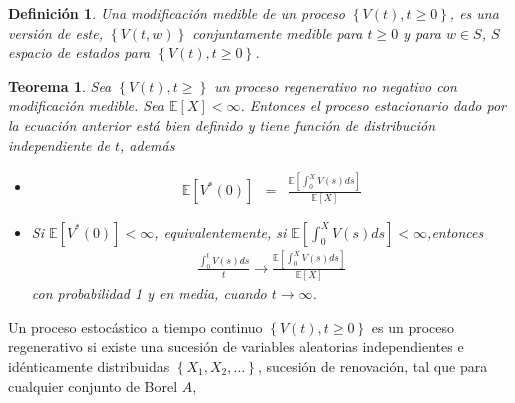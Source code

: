 \documentclass{article}
\newtheorem{Def}{Definición}
\newtheorem{Teo}{Teorema}
\newcommand{\esp}{\mathbb{E}}
\begin{document}
\begin{Def}
Una modificaci\'on medible de un proceso $\left\{V\left(t\right),t\geq0\right\}$, es una versi\'on de este, $\left\{V\left(t,w\right)\right\}$ conjuntamente medible para $t\geq0$ y para $w\in S$, $S$ espacio de estados para $\left\{V\left(t\right),t\geq0\right\}$.
\end{Def}

\begin{Teo}
Sea $\left\{V\left(t\right),t\geq\right\}$ un proceso regenerativo no negativo con modificaci\'on medible. Sea $\esp\left[X\right]<\infty$. Entonces el proceso estacionario dado por la ecuaci\'on anterior est\'a bien definido y tiene funci\'on de distribuci\'on independiente de $t$, adem\'as
\begin{itemize}
\item[i)] \begin{eqnarray*}
\esp\left[V^{*}\left(0\right)\right]&=&\frac{\esp\left[\int_{0}^{X}V\left(s\right)ds\right]}{\esp\left[X\right]}\end{eqnarray*}
\item[ii)] Si $\esp\left[V^{*}\left(0\right)\right]<\infty$, equivalentemente, si $\esp\left[\int_{0}^{X}V\left(s\right)ds\right]<\infty$,entonces
\begin{eqnarray*}
\frac{\int_{0}^{t}V\left(s\right)ds}{t}\rightarrow\frac{\esp\left[\int_{0}^{X}V\left(s\right)ds\right]}{\esp\left[X\right]}
\end{eqnarray*}
con probabilidad 1 y en media, cuando $t\rightarrow\infty$.
\end{itemize}
\end{Teo}
%




Un proceso estoc\'astico a tiempo continuo $\left\{V\left(t\right),t\geq0\right\}$ es un proceso regenerativo si existe una sucesi\'on de variables aleatorias independientes e id\'enticamente distribuidas $\left\{X_{1},X_{2},\ldots\right\}$, sucesi\'on de renovaci\'on, tal que para cualquier conjunto de Borel $A$, 
\end{document}
